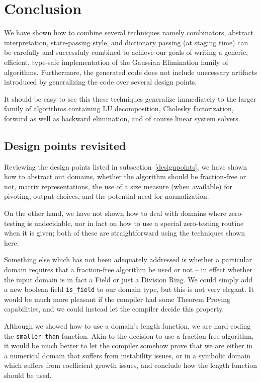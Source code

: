 \documentclass[11pt]{elsart}
\begin{document}
\section{Conclusion}\label{concl}

We have shown how to combine several techniques 
namely combinators, abstract interpretation, state-passing style, and 
dictionary passing (at staging time) can be 
carefully and successfuly combined to achieve our goals of 
writing a generic, efficient, type-safe implementation of the
Gaussian Elimination family of algorithms.  Furthermore, 
the generated code does not include unecessary artifacts introduced
by generalizing the code over several design points.

It should be easy to see this these techniques generalize immediately
to the larger family of algorithms containing LU decomposition, Cholesky 
factorization, forward as well as backward elimination, and of course
linear system solvers.

\subsection{Design points revisited}

Reviewing the design points listed in subsection~\ref{designpoints},
we have shown how to abstract out domains, whether the algorithm should
be fraction-free or not, matrix representations, the use of a size
measure (when available) for pivoting, output choices, and the
potential need for normalization.  

On the other hand, we have not shown how to deal with domains where
zero-testing is undecidable, nor in fact on how to use a special
zero-testing routine when it is given; both of these are straightforward
using the techniques shown here.  

Something else which has not been adequately addressed is whether
a particular domain requires that a fraction-free algorithm be used
or not -- in effect whether the input domain is in fact a Field or 
just a Division Ring.  We could simply add a new boolean field 
\texttt{is\_field} to our domain type, but this is not very elegant.
It would be much more pleasant if the compiler had some Theorem 
Proving capabilities, and we could instead let the compiler decide
this property.

Although we showed how to use a domain's length function, we are
hard-coding the \texttt{smaller\_than} function.  Akin to the
decision to use a fraction-free algorithm, it would be much better
to let the compiler somehow prove that we are either in a numerical
domain that suffers from instability issues, or in a symbolic domain
which suffers from coefficient growth issues, and conclude how
the length function should be used.
\end{document}

